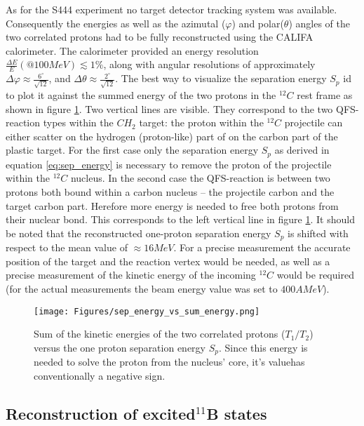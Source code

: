 As for the S444 experiment no target detector tracking system was available. Consequently the energies as well as the azimutal ($\varphi$) and polar($\theta$) angles of the two correlated protons had to be fully reconstructed using the CALIFA calorimeter. The calorimeter provided an energy resolution $\frac{\Delta E}{E}(@100MeV) \lesssim 1 \%$, along with angular resolutions of approximately  $\Delta \varphi \approx \frac{6^{\circ}}{\sqrt{12}}$, and $\Delta \theta \approx \frac{2^{\circ}}{\sqrt{12}}$.
The best way to visualize the separation energy $S_p$ id to plot it against the summed energy of the two protons in the $^{12}C$ rest frame as shown in figure \ref{fig:sep_energy}. Two vertical lines are visible. They correspond to the two QFS-reaction types within the $CH_2$ target: the proton within the $^{12}C$ projectile can either scatter on the hydrogen (proton-like) part of on the carbon part of the plastic target. For the first case only the separation energy $S_p$ as derived in equation \ref{eq:sep_energy} is necessary to remove the proton of the projectile within the $^{12}C$ nucleus. In the second case the QFS-reaction is between two protons both bound within a carbon nucleus -- the projectile carbon and the target carbon part. Herefore more energy is needed to free both protons from their nuclear bond. This corresponds to the left vertical line in figure \ref{fig:sep_energy}. It should be noted that the reconstructed one-proton separation energy $S_p$ is shifted with respect to the mean value of $\approx 16 MeV$. For a precise measurement the accurate position of the target and the reaction vertex would be needed, as well as a precise measurement of the kinetic energy of the incoming $^{12}C$ would be required (for the actual measurements the beam energy value was set to $400 AMeV$). 
\begin{figure}[htpb]
    \centering
    \texttt{[image: Figures/sep\_energy\_vs\_sum\_energy.png]}
    \caption{
	Sum of the kinetic energies of the two correlated protons ($T_1/T_2$) versus the one proton separation energy $S_p$. Since this energy is needed to solve the proton from the nucleus' core, it's valuehas conventionally a negative sign.  	 
    }
    \label{fig:sep_energy}
\end{figure}

\subsection{Reconstruction of excited$ ^{11}$B states}



